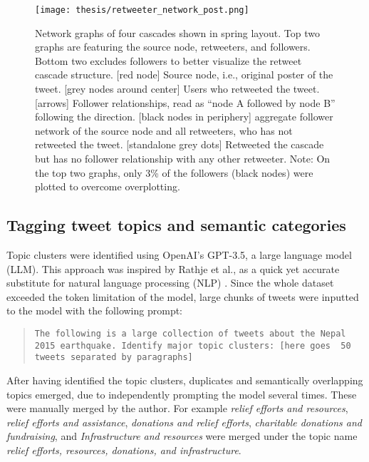\documentclass[11pt,a4paper]{article}
\begin{document}
        \begin{figure}[H]
            \hypertarget{fig:network}{}
            \centering
            \texttt{[image: thesis/retweeter\_network\_post.png]}\\
            \caption{Network graphs of four cascades shown in spring layout. Top two graphs are featuring the source node, retweeters, and followers. Bottom two excludes followers to better visualize the retweet cascade structure. [red node] Source node, i.e., original poster of the tweet. [grey nodes around center] Users who retweeted the tweet. [arrows] Follower relationships, read as \enquote{node A followed by node B} following the direction. [black nodes in periphery] aggregate follower network of the source node and all retweeters, who has not retweeted the tweet. [standalone grey dots] Retweeted the cascade but has no follower relationship with any other retweeter. Note: On the top two graphs, only 3\% of the followers (black nodes) were plotted to overcome overplotting.}    
            \label{fig:enter-label}
        \end{figure}
    
    \subsection{Tagging tweet topics and semantic categories}
    \hypertarget{sec:tagging-tweet-topic}{}
    Topic clusters were identified using OpenAI's GPT-3.5, a large language model (LLM)\cite{openai_llc_openai_2023}. This approach was inspired by Rathje et al., as a quick yet accurate substitute for natural language processing (NLP) \cite{rathje_gpt_2023}. Since the whole dataset exceeded the token limitation of the model, large chunks of tweets were inputted to the model with the following prompt: 

    \begin{quote}
         \texttt{The following is a large collection of tweets about the Nepal 2015 earthquake. Identify major  topic clusters: [here goes ~50 tweets separated by paragraphs]}   
    \end{quote}{}

    
    After having identified the topic clusters, duplicates and semantically overlapping topics emerged, due to independently prompting the model several times. These were manually merged by the author. For example \textit{relief efforts and resources}, \textit{relief efforts and assistance}, \textit{donations and relief efforts}, \textit{charitable donations and fundraising}, and \textit{Infrastructure and resources} were merged under the topic name \textit{relief efforts, resources, donations, and infrastructure}.
    
\end{document}
